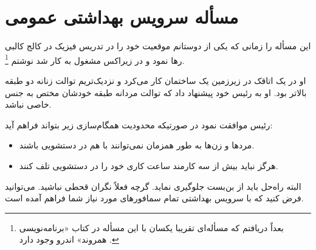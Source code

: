 \documentclass{book}
\begin{document}
\section{مسأله سرویس بهداشتی عمومی}

    این مسأله را زمانی که یکی از دوستانم موقعیت خود را در تدریس فیزیک در کالج کالبی رها نمود 
    و در زیراکس مشغول به کار شد نوشتم%
    \footnote{بعداً دریافتم که مسأله‌ای تقریبا یکسان با این مسأله در کتاب «برنامه‌نویسی همروند» اندرو وجود دارد \cite{andrews}.}. 

    او در یک اتاقک در زیرزمین یک ساختمان کار می‌کرد و نزدیک‌تریم توالت زنانه دو طبقه بالاتر بود.
    او به رئیس خود پیشنهاد داد که توالت مردانه طبقه خودشان مختص به جنس خاصی نباشد. 

    رئیس موافقت نمود در صورتیکه محدودیت همگام‌سازی زیر بتواند فراهم آید: 

\begin {itemize}

\item %
    مردها و زن‌ها به طور همزمان نمی‌توانند با هم در دستشویی باشند. 

\item %
    هرگز نباید بیش از سه کارمند ساعت کاری خود را در دستشویی تلف کنند. 
\end{itemize}

    البته راه‌حل باید از بن‌بست جلوگیری نماید. گرچه فعلاً نگران قحطی نباشید. می‌توانید فرض کنید که با سرویس بهداشتی تمام سمافورهای 
    مورد نیاز شما فراهم آمده است. 
\end{document}
